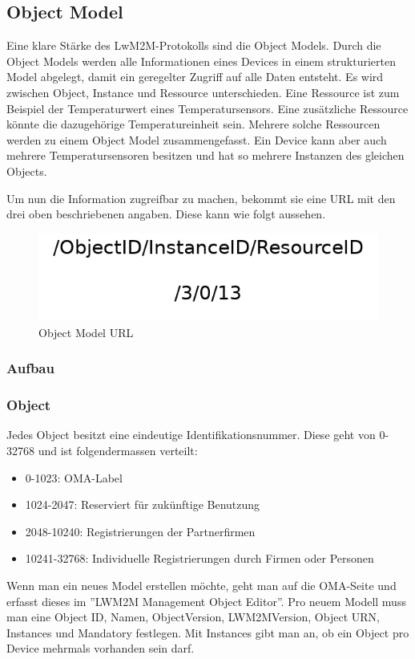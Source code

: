 \subsection{Object Model}
Eine klare Stärke des LwM2M-Protokolls sind die Object Models. Durch die Object Models werden alle Informationen eines Devices in einem strukturierten Model abgelegt, damit ein geregelter Zugriff auf alle Daten entsteht. Es wird zwischen Object, Instance und Ressource unterschieden. Eine Ressource ist zum Beispiel der Temperaturwert eines Temperatursensors. Eine zusätzliche Ressource könnte die dazugehörige Temperatureinheit sein. Mehrere solche Ressourcen werden zu einem Object Model zusammengefasst. Ein Device kann aber auch mehrere Temperatursensoren besitzen und hat so mehrere Instanzen des gleichen Objects.

Um nun die Information zugreifbar zu machen, bekommt sie eine URL mit den drei oben beschriebenen angaben. Diese kann wie folgt aussehen.
\begin{figure}[H]
\includegraphics[scale=0.35]{../02_Analyse/images/lwm2m/url_example.png}
\caption{Object Model URL}
\end{figure}
\subsubsection{Aufbau}
\subsubsection{Object}
Jedes Object besitzt eine eindeutige Identifikationsnummer. Diese geht von 0-32768 und ist folgendermassen verteilt:
\begin{itemize}
\item 0-1023: OMA-Label
\item 1024-2047: Reserviert für zukünftige Benutzung
\item 2048-10240: Registrierungen der Partnerfirmen
\item 10241-32768: Individuelle Registrierungen durch Firmen oder Personen
\end{itemize}
Wenn man ein neues Model erstellen möchte, geht man auf die OMA-Seite und erfasst dieses im ''LWM2M Management Object Editor''. Pro neuem Modell muss man eine Object ID, Namen, ObjectVersion, LWM2MVersion, Object URN, Instances und Mandatory festlegen. Mit Instances gibt man an, ob ein Object pro Device mehrmals vorhanden sein darf.
